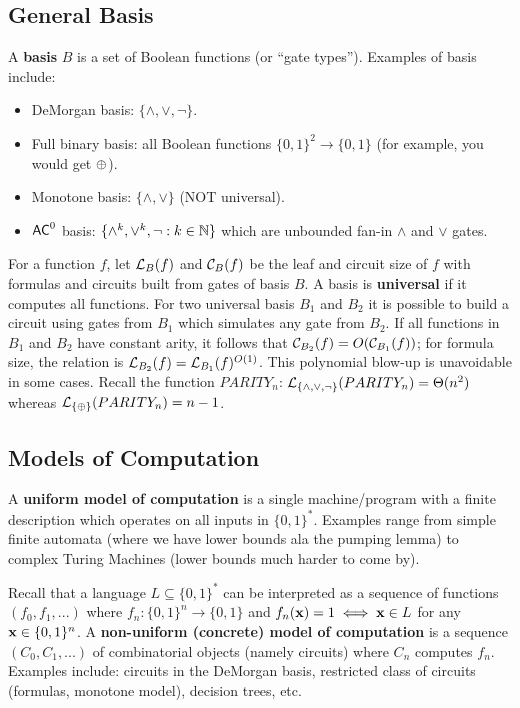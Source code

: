 \documentclass[11pt]{article}
\begin{document}
	\subsection{General Basis}
	A \textbf{basis} $B$ is a set of Boolean functions (or ``gate types''). Examples of basis include: 
	\begin{itemize}
		\item DeMorgan basis: $\{\land, \lor, \lnot\}$.
		\item Full binary basis: all Boolean functions $\{0,1\}^2 \rightarrow \{0,1\}$ (for example, you would get $\operatorname{\oplus}$).
		\item Monotone basis: $\{\land, \lor\}$ (NOT universal).
		\item $\mathsf{AC}^0$ basis: $\{\land^{k}, \lor^k, \lnot: k \in \mathbb{N}\}$ which are unbounded fan-in $\land$ and $\lor$ gates.
	\end{itemize}
	For a function $f$, let $\mathcal{L}_B(f)$ and $\mathcal{C}_B(f)$ be the leaf and circuit size of $f$ with formulas and circuits built from gates of basis $B$. A basis is \textbf{universal} if it computes all functions. For two universal basis $B_1$ and $B_2$ it is possible to build a circuit using gates from $B_1$ which simulates any gate from $B_2$. If all functions in $B_1$ and $B_2$ have constant arity, it follows that $\mathcal{C}_{B_2}(f) = O(\mathcal{C}_{B_1}(f))$; for formula size, the relation is $\mathcal{L}_{B_2}(f) = \mathcal{L}_{B_1}(f)^{O(1)}$. This polynomial blow-up is unavoidable in some cases. Recall the function $PARITY_n$: $\mathcal{L}_{\{\land, \lor, \lnot\}}(PARITY_n) = \Theta(n^2)$ whereas $\mathcal{L}_{\{\operatorname{\oplus}\}}(PARITY_n) = n-1$.
	
	\subsection{Models of Computation}
	\label{sec:uniformvsconcrete}
	\begin{definition}
		\label{def:mmodelsofcomputation} 
		A \textbf{uniform model of computation} is a single machine/program with a finite description which operates on all inputs in $\{0,1\}^*$. Examples range from simple finite automata (where we have lower bounds ala the pumping lemma) to complex Turing Machines (lower bounds much harder to come by).
		
		Recall that a language $L \subseteq \{0,1\}^*$ can be interpreted as a sequence of functions $(f_0, f_1, ...)$ where $f_n: \{0,1\}^n \rightarrow \{0,1\}$ and $f_n(\mathbf{x}) = 1 \iff \mathbf{x} \in L$ for any $\mathbf{x} \in \{0,1\}^n$. A \textbf{non-uniform (concrete) model of computation} is a sequence $(C_0, C_1, ...)$ of combinatorial objects (namely circuits) where $C_n$ computes $f_n$. Examples include: circuits in the DeMorgan basis, restricted class of circuits (formulas, monotone model), decision trees, etc.  
	\end{definition}
	
\end{document}
